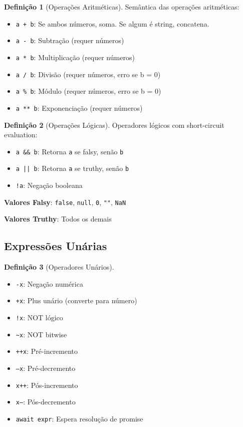 \documentclass[12pt,a4paper]{article}
\theoremstyle{definition}
\newtheorem{definition}{Definição}[section]
\begin{document}
\begin{definition}[Operações Aritméticas]
Semântica das operações aritméticas:
\begin{itemize}
    \item \texttt{a + b}: Se ambos números, soma. Se algum é string, concatena.
    \item \texttt{a - b}: Subtração (requer números)
    \item \texttt{a * b}: Multiplicação (requer números)
    \item \texttt{a / b}: Divisão (requer números, erro se b = 0)
    \item \texttt{a \% b}: Módulo (requer números, erro se b = 0)
    \item \texttt{a ** b}: Exponenciação (requer números)
\end{itemize}
\end{definition}

\begin{definition}[Operações Lógicas]
Operadores lógicos com short-circuit evaluation:
\begin{itemize}
    \item \texttt{a \&\& b}: Retorna \texttt{a} se falsy, senão \texttt{b}
    \item \texttt{a || b}: Retorna \texttt{a} se truthy, senão \texttt{b}
    \item \texttt{!a}: Negação booleana
\end{itemize}

\textbf{Valores Falsy}: \texttt{false}, \texttt{null}, \texttt{0}, \texttt{""}, \texttt{NaN}

\textbf{Valores Truthy}: Todos os demais
\end{definition}

\subsection{Expressões Unárias}

\begin{definition}[Operadores Unários]
\begin{itemize}
    \item \texttt{-x}: Negação numérica
    \item \texttt{+x}: Plus unário (converte para número)
    \item \texttt{!x}: NOT lógico
    \item \texttt{\textasciitilde x}: NOT bitwise
    \item \texttt{++x}: Pré-incremento
    \item \texttt{--x}: Pré-decremento
    \item \texttt{x++}: Pós-incremento
    \item \texttt{x--}: Pós-decremento
    \item \texttt{await expr}: Espera resolução de promise
\end{itemize}
\end{definition}
\end{document}
